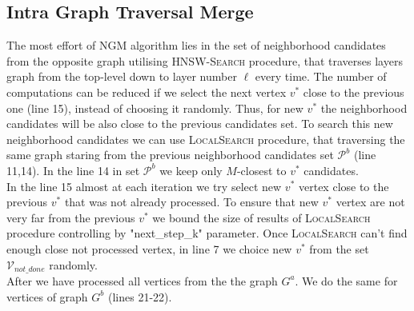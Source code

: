 \documentclass{article}
\begin{document}
\subsection{Intra Graph Traversal Merge}
The most effort of \textsc{NGM} algorithm lies in the set of neighborhood candidates from the opposite graph utilising \textsc{HNSW-Search} procedure, that traverses layers graph from the top-level down to layer number $\ell$ every time. The number of computations can be reduced if we select the next vertex $v^*$ close to the previous one (line 15), instead of choosing it randomly. Thus, for new $v^*$ the neighborhood candidates will be  also close to the previous candidates set. To search this new neighborhood candidates we can use \textsc{LocalSearch} procedure, that traversing the same graph staring from the previous neighborhood candidates set $\mathcal{P}^b$ (line 11,14). In the line 14 in set $\mathcal{P}^b$ we keep only $M$-closest to $v^*$ candidates.\\
In the line 15 almost at each iteration we try select new $v^*$ vertex close to the previous  $v^*$ that was not already processed.  
To ensure that new $v^*$ vertex are not very far from the previous $v^*$ we bound the size of results of \textsc{LocalSearch} procedure controlling by "next\_step\_k" parameter. Once \textsc{LocalSearch} can't find enough close not processed vertex, in line 7 we choice new $v^*$ from the set $\mathcal{V}_{not\_done}$ randomly. \\
After we have processed all vertices from the the graph $G^a$. We do the same for vertices of graph $G^b$ (lines 21-22).  
\end{document}
